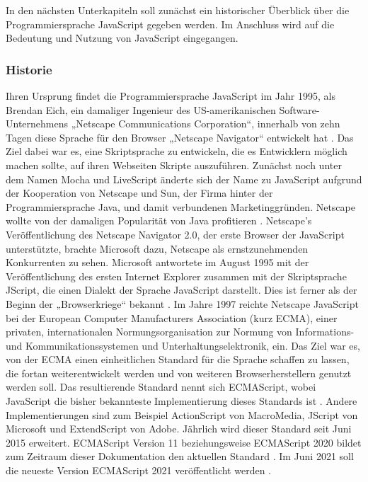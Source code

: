 In den nächsten Unterkapiteln soll zunächst ein historischer Überblick über die Programmiersprache JavaScript gegeben werden. Im Anschluss wird auf die Bedeutung und Nutzung von JavaScript eingegangen. 
\newline

\subsubsection{Historie}
Ihren Ursprung findet die Programmiersprache JavaScript im Jahr 1995, als Brendan Eich, ein damaliger Ingenieur des US-amerikanischen Software-Unternehmens „Netscape Communications Corporation“, innerhalb von zehn Tagen diese Sprache für den Browser „Netscape Navigator“ entwickelt hat \cite{JS1}. Das Ziel dabei war es, eine Skriptsprache zu entwickeln, die es Entwicklern möglich machen sollte, auf ihren Webseiten Skripte auszuführen. Zunächst noch unter dem Namen Mocha und LiveScript änderte sich der Name zu JavaScript aufgrund der Kooperation von Netscape und Sun, der Firma hinter der Programmiersprache Java, und damit verbundenen Marketinggründen. Netscape wollte von der damaligen Popularität von Java profitieren \cite{JS1.05}.
\newline
\noindent
Netscape’s Veröffentlichung des Netscape Navigator 2.0, der erste Browser der JavaScript unterstützte, brachte Microsoft dazu, Netscape als ernstzunehmenden Konkurrenten zu sehen. 
Microsoft antwortete im August 1995 mit der Veröffentlichung des ersten Internet Explorer zusammen mit der Skriptsprache JScript, die einen Dialekt der Sprache JavaScript darstellt. Dies ist ferner als der Beginn der „Browserkriege“ bekannt \cite{JS1.06}.
\newline
\noindent
Im Jahre 1997 reichte Netscape JavaScript bei der European Computer Manufacturers Association (kurz ECMA), einer privaten, internationalen Normungsorganisation zur Normung von Informations- und Kommunikationssystemen und Unterhaltungselektronik, ein. Das Ziel war es, von der ECMA einen einheitlichen Standard für die Sprache schaffen zu lassen, die fortan weiterentwickelt werden und von weiteren Browserherstellern genutzt werden soll. Das resultierende Standard nennt sich ECMAScript, wobei JavaScript die bisher bekannteste Implementierung dieses Standards ist \cite{JS1.07}.
Andere Implementierungen sind zum Beispiel ActionScript von Macro\-Media, JScript von Microsoft und ExtendScript von Adobe.
\newline
\noindent
Jährlich wird dieser Standard seit Juni 2015 erweitert. ECMAScript Version 11 beziehungs\-weise ECMAScript 2020 bildet zum Zeitraum dieser Dokumentation den aktuellen Standard \cite{JS1.08}. 
Im Juni 2021 soll die neueste Version ECMAScript 2021 veröffentlicht werden \cite{JS1.09}. 
\newline

